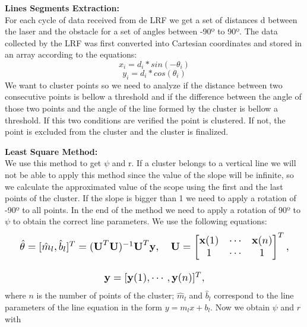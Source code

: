 \documentclass[a4paper]{IEEEtran}
\begin{document}
\textbf{Lines Segments Extraction:}\\
For each cycle of data received from de LRF we get a set of distances d between the laser and the obstacle for a set of angles between -90º to 90º.
The data collected by the LRF was first converted into Cartesian coordinates and stored in an array according to the equations:
\begin{equation}
x_{i}=d_{i}*sin(-\theta_{i})
\end{equation}
\begin{equation}
y_{i}=d_{i}*cos(\theta_{i})
\end{equation}
We want to cluster points so we need to analyze if the distance between two consecutive points
is bellow a threshold and if the difference between the angle of those two points and the angle of the line formed by the cluster is bellow a threshold. If this two conditions are verified the point is clustered. If not, the point is excluded from the cluster and the cluster is finalized. 

\textbf{Least Square Method:}\\
We use this method to get $\psi$ and r. 
If a cluster belongs to a vertical line we will not be able to apply this method since the value of the slope will be infinite, so we calculate the approximated value of the scope using the first and the last points of the cluster. If the slope is bigger than 1 we need to apply a rotation of -90º to all points. In the end of the method we need to apply a rotation of 90º to $\psi$ to obtain the correct line parameters.
We use the following equations:
\begin{equation}
\label{eq:U}
\resizebox{1.0\hsize}{!}{ \begin{array}[t]{cc} \hat{\theta}=[\hat{m}_l,\hat{b}_l]^T=(\textbf{U}^T \textbf{U})^{-1} \textbf{U}^T \textbf{y}, \quad 
\textbf{U}=\begin{bmatrix}
       \textbf{x}(1) & \cdots & \textbf{x}(n) \\
       1 & \cdots & 1 \\
  \end{bmatrix}^T,\\
\\
\textbf{y}=[\textbf{y}(1),\cdots,\textbf{y}(n)]^T,
\end{array}
}
\end{equation}
%
where $n$ is the number of points of the cluster; $\hat{m}_l$ and $\hat{b}_l$ correspond to the line parameters of the line equation in the form $y=m_lx+b_l$. Now we obtain $\psi$ and $\textit{r}$ with
\end{document}
